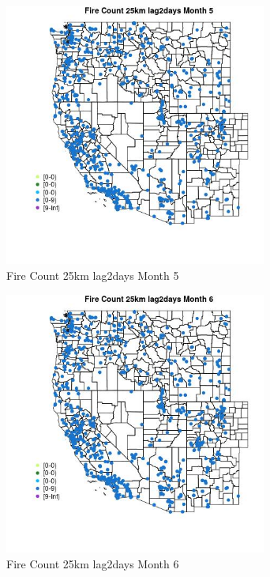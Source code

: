 \begin{figure} 
\centering  
\includegraphics[width=0.77\textwidth]{Code_Outputs/Report_ML_input_PM25_Step4_part_e_de_duplicated_aves_compiled_2019-05-21wNAs_MapObsMo5Fire_Count_25km_lag2days.jpg} 
\caption{\label{fig:Report_ML_input_PM25_Step4_part_e_de_duplicated_aves_compiled_2019-05-21wNAsMapObsMo5Fire_Count_25km_lag2days}Fire Count 25km lag2days Month 5} 
\end{figure} 
 

\begin{figure} 
\centering  
\includegraphics[width=0.77\textwidth]{Code_Outputs/Report_ML_input_PM25_Step4_part_e_de_duplicated_aves_compiled_2019-05-21wNAs_MapObsMo6Fire_Count_25km_lag2days.jpg} 
\caption{\label{fig:Report_ML_input_PM25_Step4_part_e_de_duplicated_aves_compiled_2019-05-21wNAsMapObsMo6Fire_Count_25km_lag2days}Fire Count 25km lag2days Month 6} 
\end{figure} 
 

